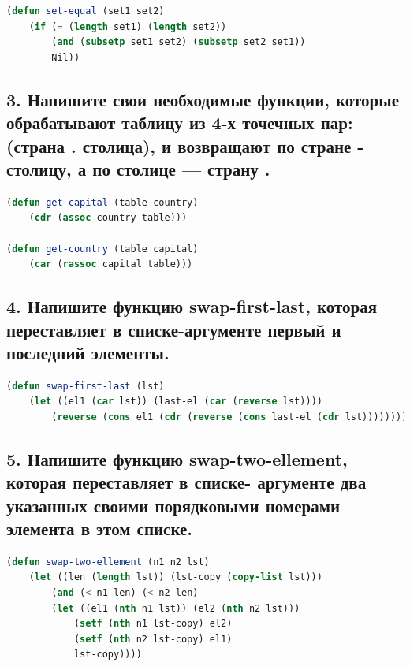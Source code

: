 \documentclass[12pt]{report}
\begin{document}
\begin{lstlisting}[label=6xd, caption=Решение задания №2, language=lisp]
(defun set-equal (set1 set2)
	(if (= (length set1) (length set2))
		(and (subsetp set1 set2) (subsetp set2 set1))
		Nil))

\end{lstlisting}

\subsection*{3.  Напишите свои необходимые функции, которые обрабатывают таблицу из 4-х точечных
	пар:
	(страна . столица), и возвращают по стране - столицу, а по столице — страну .}

\begin{lstlisting}[label=6xd, caption=Решение задания №3, language=lisp]
(defun get-capital (table country)
	(cdr (assoc country table)))

(defun get-country (table capital)
	(car (rassoc capital table)))

\end{lstlisting}

\subsection*{4.  Напишите функцию swap-first-last, которая переставляет в списке-аргументе первый и
	последний элементы.}

\begin{lstlisting}[label=6xd, caption=Решение задания №4, language=lisp]
(defun swap-first-last (lst)
	(let ((el1 (car lst)) (last-el (car (reverse lst))))
		(reverse (cons el1 (cdr (reverse (cons last-el (cdr lst))))))))

\end{lstlisting}

\subsection*{5. Напишите функцию swap-two-ellement, которая переставляет в списке- аргументе два
	указанных своими порядковыми номерами элемента в этом списке.}

\begin{lstlisting}[label=6xd, caption=Решение задания №5, language=lisp]
(defun swap-two-ellement (n1 n2 lst)
	(let ((len (length lst)) (lst-copy (copy-list lst)))
		(and (< n1 len) (< n2 len)
		(let ((el1 (nth n1 lst)) (el2 (nth n2 lst)))
			(setf (nth n1 lst-copy) el2)
			(setf (nth n2 lst-copy) el1)
			lst-copy))))
	
\end{lstlisting}
\end{document}
